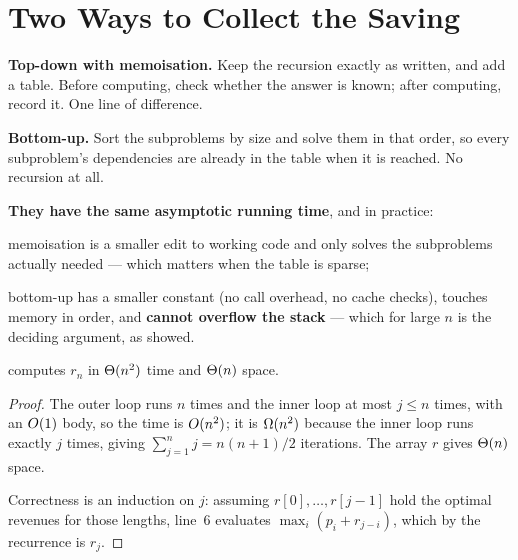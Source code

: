 \section{Two Ways to Collect the Saving}

\begin{conceptbox}
\textbf{Top-down with memoisation.} Keep the recursion exactly as written, and
add a table. Before computing, check whether the answer is known; after
computing, record it. One line of difference.

\smallskip
\textbf{Bottom-up.} Sort the subproblems by size and solve them in that order,
so every subproblem's dependencies are already in the table when it is reached.
No recursion at all.

\smallskip
\textbf{They have the same asymptotic running time}, and in practice:

\begin{tight}
  \item memoisation is a smaller edit to working code and only solves the
        subproblems actually needed --- which matters when the table is sparse;
  \item bottom-up has a smaller constant (no call overhead, no cache checks),
        touches memory in order, and \textbf{cannot overflow the stack} ---
        which for large $n$ is the deciding argument, as 
        showed.
\end{tight}
\end{conceptbox}


\begin{theorem}\label{thm:cutroddp}
 computes $r_{n}$ in $\Theta(n^{2})$ time and
$\Theta(n)$ space.
\end{theorem}

\begin{proof}
The outer loop runs $n$ times and the inner loop at most $j \le n$ times, with
an $O(1)$ body, so the time is $O(n^{2})$; it is $\Omega(n^{2})$
because the inner loop runs exactly $j$ times, giving
$\sum_{j=1}^{n} j = n(n+1)/2$ iterations. The array $r$ gives $\Theta(n)$
space.

\smallskip
Correctness is an induction on $j$: assuming $r[0], \ldots, r[j-1]$ hold the
optimal revenues for those lengths, line~6 evaluates $\max_{i}(p_{i} +
r_{j-i})$, which by the recurrence is $r_{j}$.
\end{proof}

